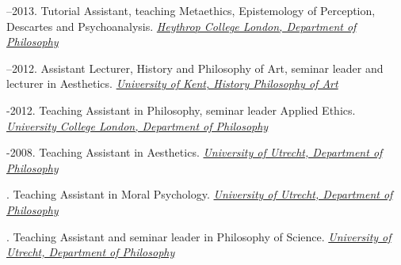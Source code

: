 \documentclass[11pt]{article}
\begin{document}
--2013. Tutorial Assistant, teaching Metaethics, Epistemology of Perception, Descartes and Psychoanalysis. \href{http://www.heythrop.ac.uk/departments/academic-departments/philosophy/}{\emph{Heythrop College London, Department of  Philosophy} \vspace{0.01in}}

\medskip

--2012. Assistant Lecturer, History and Philosophy of Art, seminar leader and lecturer in Aesthetics. \href{http://www.kent.ac.uk/arts/hpa/index.html}{\emph{University of Kent, History \amper Philosophy of Art} \vspace{0.01in}}

\medskip

-2012. Teaching Assistant in Philosophy, seminar leader Applied Ethics. \href{http://www.ucl.ac.uk/philosophy/}{\emph{University College London, Department of  Philosophy}} \vspace{0.01in}

% 
% 
% 
-2008. Teaching Assistant in Aesthetics. \href{http://www.uu.nl/faculty/humanities/EN/organisation/departments/departmentofphilosophy/Pages/default.aspx}{\emph{University of Utrecht, Department of  Philosophy}} \vspace{0.01in}

. Teaching Assistant in Moral Psychology. \href{http://www.uu.nl/faculty/humanities/EN/organisation/departments/departmentofphilosophy/Pages/default.aspx}{\emph{University of Utrecht, Department of  Philosophy}} \vspace{0.01in}

. Teaching Assistant and seminar leader in Philosophy of Science. \href{http://www.uu.nl/faculty/humanities/EN/organisation/departments/departmentofphilosophy/Pages/default.aspx}{\emph{University of Utrecht, Department of  Philosophy}} \vspace{0.01in}

\bigskip


% 
% 
% 
% 
\end{document}
